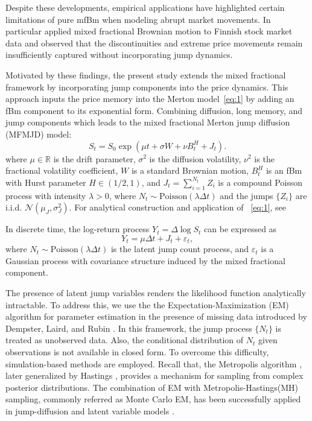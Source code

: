 \documentclass[a4paper,11pt]{amsart}
\theoremstyle{definition}
\theoremstyle{plain}
\theoremstyle{remark}
\newcommand{\1}{\mathbf{1}}
\begin{document}
Despite these developments, empirical applications have highlighted certain limitations of pure mfBm when modeling abrupt market movements. In particular \cite{dufitinema2020} applied mixed fractional Brownian motion to Finnish stock market data and observed that the discontinuities and extreme price movements remain insufficiently captured without incorporating jump dynamics.

Motivated by these findings, the present study extends the mixed fractional framework by incorporating jump components into the price dynamics. This approach inputs the price memory into the Merton model~\ref{eq:1} by adding an fBm component to its exponential form. Combining diffusion, long memory, and jump components which leads to the mixed fractional Merton jump diffusion (MFMJD) model:
\begin{equation}
\label{eq:3}
S_t = S_0 \exp\left(\mu t +\sigma W + \nu B_t^{H} + J_t\right).
\end{equation}
where $\mu \in \mathbb{R}$ is the drift parameter, $\sigma^2 $ is the diffusion volatility, $\nu^2 $ is the fractional volatility coefficient, $W$ is a standard Brownian motion, $B_t^H$ is an fBm with Hurst parameter $H \in (1/2,1)$, and $J_t = \sum_{i=1}^{N_t} Z_i$ is a compound Poisson process with intensity $\lambda > 0$, where $N_t \sim \text{Poisson}(\lambda \Delta t)$ and the jumps $\{Z_i\}$ are i.i.d. 
${\mathcal N}( \mu_J,\sigma_J^2)$. For analytical construction and application of ~\ref{eq:1}, see \cite{merton1976option}

In discrete time, the log-return process $Y_t = \Delta\log S_t $ can be expressed as
\begin{equation*}
Y_t = \mu \Delta t + J_t + \varepsilon_t,
\end{equation*}
where $N_t \sim \text{Poisson}(\lambda \Delta t)$ is the latent jump count process, and $\varepsilon_t$ is a Gaussian process with covariance structure induced by the mixed fractional component.

The presence of latent jump variables renders the likelihood function analytically intractable. To address this, we use the the Expectation-Maximization (EM) algorithm for parameter estimation in the presence of missing data introduced by Dempster, Laird, and Rubin \cite{Dempster1977} . In this framework, the jump process $\{N_t\}$ is treated as unobserved data. Also, the conditional distribution of $N_t$ given observations is not available in closed form. To overcome this difficulty, simulation-based methods are employed. Recall that, the Metropolis algorithm \cite{Metropolis1953}, later generalized by Hastings \cite{Hastings1970}, provides a mechanism for sampling from complex posterior distributions. The combination of EM with Metropolis-Hastings(MH) sampling, commonly referred as Monte Carlo EM, has been successfully applied in jump-diffusion and latent variable models \cite{Ball1985, Johannes2009}.
\end{document}
